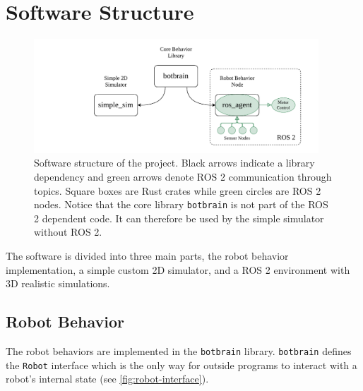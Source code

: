 \section{Software Structure}

\begin{figure}
    \begin{center}
        \includegraphics[width=0.95\textwidth]{figures/software-structure.pdf}
    \end{center}
    \caption{Software structure of the project. Black arrows indicate a library dependency and green arrows denote ROS 2 communication through topics. Square boxes are Rust crates while green circles are ROS 2 nodes. Notice that the core library \texttt{botbrain} is not part of the ROS 2 dependent code. It can therefore be used by the simple simulator without ROS 2.}\label{fig:}
\end{figure}


The software is divided into three main parts, the robot behavior implementation, a simple custom 2D
simulator, and a ROS 2 environment with 3D realistic simulations.

\subsection{Robot Behavior}
The robot behaviors are implemented in the \texttt{botbrain} library. \texttt{botbrain} defines the \texttt{Robot} interface
which is the only way for outside programs to interact with a robot’s internal state (see \cref{fig:robot-interface}).

